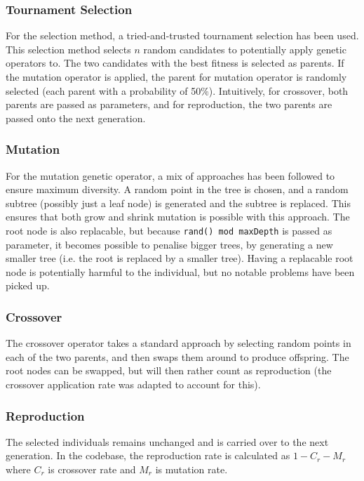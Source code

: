 \documentclass{article}
\begin{document}
\subsubsection{Tournament Selection}
For the selection method, a tried-and-trusted tournament selection has been used. This selection method selects \(n\) random candidates to potentially apply genetic operators to. The two candidates with the best fitness is selected as parents. If the mutation operator is applied, the parent for mutation operator is randomly selected (each parent with a probability of 50\%). Intuitively, for crossover, both parents are passed as parameters, and for reproduction, the two parents are passed onto the next generation.

\subsubsection{Mutation}
For the mutation genetic operator, a mix of approaches has been followed to ensure maximum diversity. A random point in the tree is chosen, and a random subtree (possibly just a leaf node) is generated and the subtree is replaced. This ensures that both grow and shrink mutation is possible with this approach. The root node is also replacable, but because \texttt{rand() mod maxDepth} is passed as parameter, it becomes possible to penalise bigger trees, by generating a new smaller tree (i.e. the root is replaced by a smaller tree). Having a replacable root node is potentially harmful to the individual, but no notable problems have been picked up.

\subsubsection{Crossover}
The crossover operator takes a standard approach by selecting random points in each of the two parents, and then swaps them around to produce offspring. The root nodes can be swapped, but will then rather count as reproduction (the crossover application rate was adapted to account for this).

\subsubsection{Reproduction}
The selected individuals remains unchanged and is carried over to the next generation. In the codebase, the reproduction rate is calculated as \(1-C_r-M_r\) where \(C_r\) is crossover rate and \(M_r\) is mutation rate.
\end{document}
